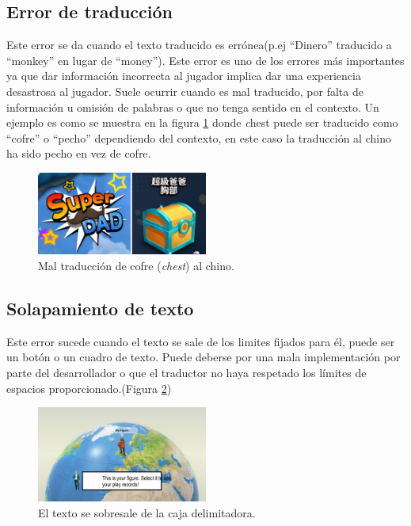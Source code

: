 \subsection{Error de traducción}\label{ErrorTraducción}
Este error se da cuando el texto traducido es errónea(p.ej ``Dinero'' traducido a ``monkey'' en lugar de ``money''). Este error es uno de los errores más importantes ya que dar información incorrecta al jugador implica dar una experiencia desastrosa al jugador.
Suele ocurrir cuando es mal traducido, por falta de información u omisión de palabras o que no tenga sentido en el contexto. Un ejemplo es como se muestra en la figura \ref{fig:ETraduccion} donde \textit chest puede ser traducido como ``cofre'' o ``pecho'' dependiendo del contexto, en este caso la traducción al chino ha sido pecho en vez de cofre.
\begin{figure}[H]
	\centering
	\includegraphics[width = 0.5\textwidth]{Imagenes/Errores_Localizacion/E_Traduccion.png}
	\caption{Mal traducción de cofre (\textit{chest}) al chino.}
	\label{fig:ETraduccion}
\end{figure}

\subsection{Solapamiento de texto}\label{ErrorSolapamiento}
Este error sucede cuando el texto se sale de los limites fijados para él, puede ser un botón o un cuadro de texto. Puede deberse por una mala implementación por parte del desarrollador o que el traductor no haya respetado los límites de espacios proporcionado.(Figura \ref{fig:E_Solapa})
\begin{figure}[H]
	\centering
	\includegraphics[width = 0.5\textwidth]{Imagenes/Errores_Localizacion/E_Solapamiento.png}
	\caption{El texto se sobresale de la caja delimitadora.}
	\label{fig:E_Solapa}
\end{figure}

